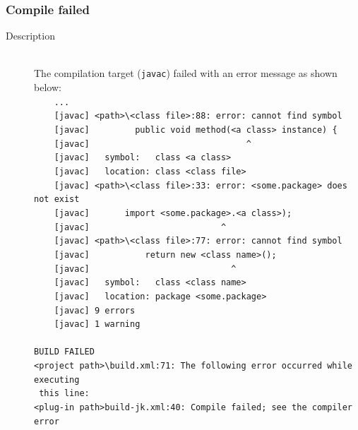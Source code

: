 \subsubsection{Compile failed}
\label{sec:Compile failed}
\begin{description}
	\item[Description] $ $\\
		The compilation target (\texttt{javac}) failed with an error message as shown below:
		\small$ $\\
			\verb|    ...|\\
			\verb|    [javac] <path>\<class file>:88: error: cannot find symbol|\\ 
			\verb|    [javac]         public void method(|\color{red}\verb|<a class>|\color{black}\verb| instance) {|\\
			\verb|    [javac]                               ^|\\
			\verb|    [javac]   symbol:   class |\color{red}\verb|<a class>|\color{black}\\
			\verb|    [javac]   location: class <class file>|\\
			\verb|    [javac] <path>\<class file>:33: error: |\color{red}\verb|<some.package>|\color{black}\verb| does not exist|\\
			\verb|    [javac] 		import |\color{red}\verb|<some.package>|\color{black}\verb|.<a class>);|\\
			\verb|    [javac]                          ^|\\
			\verb|    [javac] <path>\<class file>:77: error: cannot find symbol|\\
			\verb|    [javac] 			return new |\color{red}\verb|<class name>|\color{black}\verb|();|\\
			\verb|    [javac] 			                 ^|\\
			\verb|    [javac]   symbol:   class |\color{red}\verb|<class name>|\color{black}\\
			\verb|    [javac]   location: package <some.package>|\\
			\verb|    [javac] 9 errors|\\
			\verb|    [javac] 1 warning|\\
			\verb|    |\\
			\verb|BUILD FAILED|\\
			\verb|<project path>\build.xml:71: The following error occurred while executing|\\
			\verb| this line:|\\
			\verb|<plug-in path>build-jk.xml:40: Compile failed; see the compiler error|\\

\end{description}
